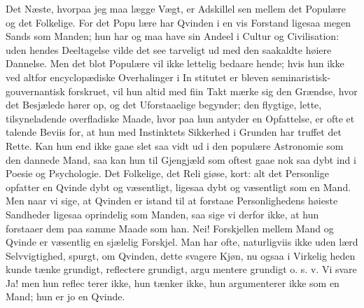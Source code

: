 \documentclass[12pt]{book}
\newcommand{\opage}[1]{\marginnote{\footnotesize\textit{[#1]}}}
\begin{document}
Det Næste, hvorpaa jeg maa lægge Vægt, er Adskillel\-%
sen mellem det Populære og det Folkelige. For det Popu\-%
lære har Qvinden i en vis Forstand ligesaa megen Sands
som Manden; hun har og maa have sin Andeel i Cultur
og Civilisation: uden hendes Deeltagelse vilde det see
tarveligt ud med den saakaldte høiere Dannelse. Men
det blot Populære vil ikke lettelig bedaare hende; hvis
hun ikke ved altfor encyclopædiske Overhalinger i In\-%
stitutet er bleven seminaristisk-gouvernantisk forskruet,
vil hun altid med fiin Takt mærke sig den Grændse, hvor
det Besjælede hører op, og det Uforstaaelige begynder;
den flygtige, lette, tilsyneladende overfladiske Maade, hvor\-%
paa hun antyder en Opfattelse, er ofte et talende Beviis
for, at hun med Instinktets Sikkerhed i Grunden har
truffet det Rette. Kan hun end ikke gaae slet saa vidt
ud i den populære Astronomie som den dannede Mand,
saa kan hun til Gjengjæld som oftest gaae nok saa dybt
ind i Poesie og Psychologie. Det Folkelige, det Reli\-%
giøse, kort: alt det Personlige opfatter en Qvinde dybt
og væsentligt, ligesaa dybt og væsentligt som en Mand.
Men naar vi sige, at Qvinden er istand til at forstaae
Personlighedens høieste Sandheder ligesaa oprindelig som
\opage{285}\setcounter{footnote}{0}%
Manden, saa sige vi derfor ikke, at hun forstaaer dem
paa samme Maade som han. Nei! Forskjellen mellem
Mand og Qvinde er væsentlig en sjælelig Forskjel. Man
har ofte, naturligviis ikke uden lærd Selvvigtighed, spurgt,
om Qvinden, dette svagere Kjøn, nu ogsaa i Virkelig\-%
heden kunde tænke grundigt, reflectere grundigt, argu\-%
mentere grundigt o. s. v. Vi svare Ja! men hun reflec\-%
terer ikke, hun tænker ikke, hun argumenterer ikke som
en Mand; hun er jo en Qvinde.
\end{document}
